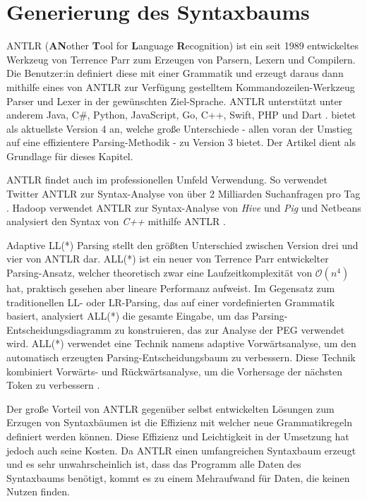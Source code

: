 \chapter{Generierung des Syntaxbaums}
\label{cha:antlr}

ANTLR (\textbf{AN}other \textbf{T}ool for \textbf{L}anguage \textbf{R}ecognition) ist ein seit 1989 entwickeltes Werkzeug von Terrence Parr zum Erzeugen von Parsern, Lexern und Compilern. Die Benutzer:in definiert diese mit einer Grammatik und erzeugt daraus dann mithilfe eines von ANTLR zur Verfügung gestelltem Kommandozeilen-Werkzeug Parser und Lexer in der gewünschten Ziel-Sprache. ANTLR unterstützt unter anderem Java, C\#, Python, JavaScript, Go, C++, Swift, PHP und Dart \parencite{antlrtargets}. \toya bietet als aktuellste Version 4 an, welche große Unterschiede - allen voran der Umstieg auf eine effizientere Parsing-Methodik - zu Version 3 bietet. Der Artikel \textcite{antlrMegaTutorial} dient als Grundlage für dieses Kapitel.

ANTLR findet auch im professionellen Umfeld Verwendung. So verwendet Twitter ANTLR zur Syntax-Analyse von über 2 Milliarden Suchanfragen pro Tag \parencite{antlrWebsite}. Hadoop verwendet ANTLR zur Syntax-Analyse von \textit{Hive} und \textit{Pig} und Netbeans analysiert den Syntax von \textit{C++} mithilfe ANTLR \parencite{antlrabout}.

Adaptive LL(*) Parsing stellt den größten Unterschied zwischen Version drei und vier von ANTLR dar. ALL(*) ist ein neuer von Terrence Parr entwickelter Parsing-Ansatz, welcher theoretisch zwar eine Laufzeitkomplexität von $\mathcal{O}(n^4)$ hat, praktisch gesehen aber lineare Performanz aufweist. Im Gegensatz zum traditionellen LL- oder LR-Parsing, das auf einer vordefinierten Grammatik basiert, analysiert ALL(*) die gesamte Eingabe, um das Parsing-Entscheidungsdiagramm zu konstruieren, das zur Analyse der PEG verwendet wird. ALL(*) verwendet eine Technik namens adaptive Vorwärtsanalyse, um den automatisch erzeugten Parsing-Entscheidungsbaum zu verbessern. Diese Technik kombiniert Vorwärts- und Rückwärtsanalyse, um die Vorhersage der nächsten Token zu verbessern \parencite{parr2014adaptive}.

Der große Vorteil von ANTLR gegenüber selbst entwickelten Lösungen zum Erzugen von Syntaxbäumen ist die Effizienz mit welcher neue Grammatikregeln definiert werden können. Diese Effizienz und Leichtigkeit in der Umsetzung hat jedoch auch seine Kosten. Da ANTLR einen umfangreichen Syntaxbaum erzeugt und es sehr unwahrscheinlich ist, dass das Programm alle Daten des Syntaxbaums benötigt, kommt es zu einem Mehraufwand für Daten, die keinen Nutzen finden.

